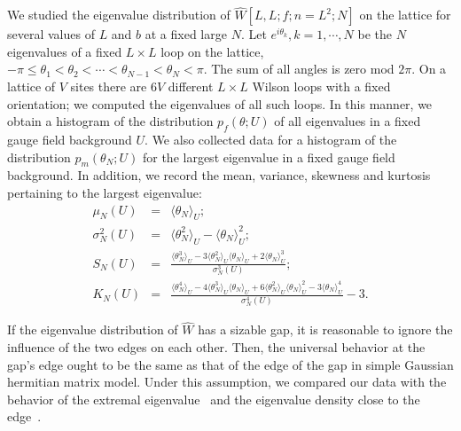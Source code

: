 We studied the eigenvalue
distribution of $\hat W [L , L ; f;
n=L^2;N]$ on the lattice
for several values of $L$ and $b$ at a fixed large $N$.
Let $e^{i\theta_k}, k=1,\cdots,N$ be the $N$ eigenvalues
of a fixed $L\times L$ loop on the lattice, $-\pi \le \theta_1 <
\theta_2 < \cdots < \theta_{N-1} < \theta_N < \pi$.
The sum of all angles is zero mod $2\pi$. On a lattice of $V$
sites there are $6V$ different $L\times L$ Wilson loops with
a fixed orientation; we computed the eigenvalues
of all such loops. In this manner, we obtain a
histogram of the distribution
$p_f(\theta;U)$ of all eigenvalues
in a fixed gauge field background $U$.
We also collected data for a histogram of the distribution
$p_m(\theta_N;U)$ for the largest eigenvalue in a fixed
gauge field background. In addition, we record
the mean, variance, skewness and kurtosis
pertaining to the largest eigenvalue:
\begin{eqnarray}
\mu_N(U) &=& \langle \theta_N \rangle_U;\nonumber\\
\sigma^2_N(U) &=& \langle \theta^2_N \rangle_U - \langle
\theta_N \rangle^2_U;\nonumber\\[0.6em]
S_N(U) &=&
\frac{ \langle \theta^3_N \rangle_U
-3 \langle \theta^2_N \rangle_U \langle \theta_N \rangle_U
+ 2 \langle \theta_N \rangle^3_U }{\sigma^3_N(U)};\nonumber\\[0.6em]
K_N(U) &=&
\frac{ \langle \theta^4_N \rangle_U
-4 \langle \theta^3_N \rangle_U \langle \theta_N \rangle_U
+6 \langle \theta^2_N \rangle_U \langle \theta_N \rangle^2_U
-3 \langle \theta_N \rangle^4_U }{\sigma^4_N(U)}-3.
\end{eqnarray}

If the eigenvalue distribution of $\hat W$ has a sizable gap, it
is reasonable to ignore the influence of the two edges on each
other. Then, the universal behavior at the gap's edge ought to be
the same as that of the edge of the gap in simple Gaussian
hermitian matrix model. Under this assumption, we compared our
data with the behavior of the extremal eigenvalue~\cite{tracy}
and the eigenvalue density close to the edge~\cite{gff}.

